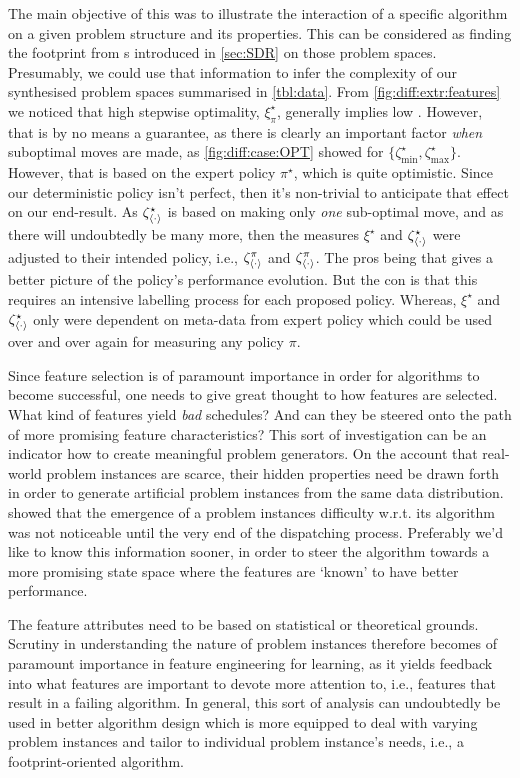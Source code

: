 The main objective of this  was to illustrate the 
interaction of a specific algorithm on a given problem structure and its 
properties. 
This can be considered as finding the footprint from \sdr s introduced in 
\cref{sec:SDR} on those problem spaces. 
Presumably, we could use that information to infer the complexity of our 
synthesised problem spaces summarised in \cref{tbl:data}.
From \cref{fig:diff:extr:features} we noticed that high stepwise optimality, 
$\xi^{\star}_{\pi}$, generally implies low \namerho. 
However, that is by no means a guarantee, as there is clearly an important 
factor \emph{when} suboptimal moves are made, as \cref{fig:diff:case:OPT} 
showed for $\{\zeta_{\min}^{\star},\zeta_{\max}^{\star}\}$. 
However, that is based on the expert policy $\pi^\star$, which is quite 
optimistic. Since our deterministic policy isn't perfect, then it's non-trivial 
to anticipate that effect on our end-result. 
As $\zeta_{\langle \cdot \rangle}^{\star}$ is based on making only \emph{one} sub-optimal move, 
and as there will undoubtedly be many more, then the measures $\xi^{\star}$ and 
$\zeta_{\langle \cdot \rangle}^{\star}$ were adjusted to their intended policy, i.e., 
$\zeta_{\langle \cdot \rangle}^{\pi}$ and $\zeta_{\langle \cdot \rangle}^{\pi}$. 
The pros being that gives a better picture of the policy's performance 
evolution. But the con is that this requires an intensive labelling process for 
each proposed policy. 
Whereas, $\xi^{\star}$ and $\zeta_{\langle \cdot \rangle}^{\star}$ only were dependent on 
meta-data from expert policy which could be used over and over again for 
measuring any policy $\pi$.

Since feature selection is of paramount importance in order for algorithms to 
become successful, one needs to give great thought to how features are 
selected. What kind of features yield \emph{bad} schedules? And can they be 
steered onto the path of more promising feature characteristics? This sort of 
investigation can be an indicator how to create meaningful problem generators. 
On the account that real-world problem instances are scarce, their hidden 
properties need be drawn forth in order to generate artificial problem 
instances from the same data distribution. 
 showed that the emergence of a problem instances 
difficulty w.r.t. its algorithm was not noticeable until the very end of the 
dispatching process. Preferably we'd like to know this information sooner, in 
order to steer the algorithm towards a more promising state space where the 
features are `known' to have better performance. 

The feature attributes need to be based on statistical or theoretical grounds. 
Scrutiny in understanding the nature of problem instances therefore becomes of 
paramount importance in feature engineering for learning, as it yields feedback 
into what features are important to devote more attention to, i.e., features 
that result in a failing algorithm. 
In general, this sort of analysis can undoubtedly be used in better 
algorithm design which is more equipped to deal with varying problem instances 
and tailor to individual problem instance's needs, i.e., a footprint-oriented 
algorithm.


